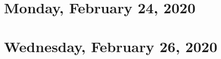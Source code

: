 \documentclass{../mynotes}
\begin{document}
\section{Monday, February 24, 2020}
	
\section{Wednesday, February 26, 2020}
    
%     

% 	
%     
%     

% 	
%     
%     
\end{document}

